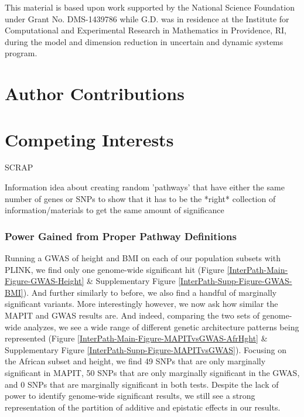 \documentclass[12pt,a4paper]{article}
\begin{document}
This material is based upon work supported by the National Science Foundation under Grant No. DMS-1439786 while G.D. was in residence at the Institute for Computational and Experimental Research in Mathematics in Providence, RI, during the model and dimension reduction in uncertain and dynamic systems program.

\section{Author Contributions}\label{InterPath-Author-Contributions}

\section{Competing Interests}\label{InterPath-Competing-Interests}

\nolinenumbers

\begingroup


\endgroup














\iffalse

SCRAP

Information idea about creating random 'pathways' that have either the same number of genes or SNPs to show that it has to be the *right* collection of information/materials to get the same amount of significance

\subsubsection{Power Gained from Proper Pathway Definitions}

Running a GWAS of height and BMI on each of our population subsets with PLINK, we find only one genome-wide significant hit (Figure \ref{InterPath-Main-Figure-GWAS-Height} \& Supplementary Figure \ref{InterPath-Supp-Figure-GWAS-BMI}). And further similarly to before, we also find a handful of marginally significant variants. More interestingly however, we now ask how similar the MAPIT and GWAS results are. And indeed, comparing the two sets of genome-wide analyzes, we see a wide range of different genetic architecture patterns being represented (Figure \ref{InterPath-Main-Figure-MAPITvsGWAS-AfrHght} \& Supplementary Figure \ref{InterPath-Supp-Figure-MAPITvsGWAS}). Focusing on the African subset and height, we find 49 SNPs that are only marginally significant in MAPIT, 50 SNPs that are only marginally significant in the GWAS, and 0 SNPs that are marginally significant in both tests. Despite the lack of power to identify genome-wide significant results, we still see a strong representation of the partition of additive and epistatic effects in our results. 
\end{document}
